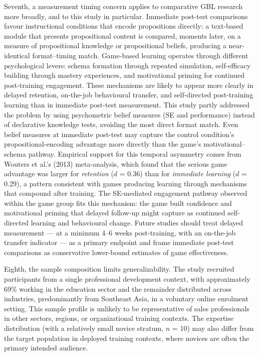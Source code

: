 \documentclass[12pt]{report}
\begin{document}
Seventh, a measurement timing concern applies to comparative GBL research more broadly, and to this study in particular. Immediate post-test comparisons favour instructional conditions that encode propositions directly: a text-based module that presents propositional content is compared, moments later, on a measure of propositional knowledge or propositional beliefs, producing a near-identical format--timing match. Game-based learning operates through different psychological levers: schema formation through repeated simulation, self-efficacy building through mastery experiences, and motivational priming for continued post-training engagement. These mechanisms are likely to appear more clearly in delayed retention, on-the-job behavioural transfer, and self-directed post-training learning than in immediate post-test measurement. This study partly addressed the problem by using psychometric belief measures (SE and performance) instead of declarative knowledge tests, avoiding the most direct format match. Even belief measures at immediate post-test may capture the control condition's propositional-encoding advantage more directly than the game's motivational--schema pathway. Empirical support for this temporal asymmetry comes from Wouters et al.'s (2013) meta-analysis, which found that the serious game advantage was larger for \textit{retention} ($d$ = 0.36) than for \textit{immediate learning} ($d$ = 0.29), a pattern consistent with games producing learning through mechanisms that compound after training. The SE-mediated engagement pathway observed within the game group fits this mechanism: the game built confidence and motivational priming that delayed follow-up might capture as continued self-directed learning and behavioural change. Future studies should treat delayed measurement --- at a minimum 4--6 weeks post-training, with an on-the-job transfer indicator --- as a primary endpoint and frame immediate post-test comparisons as conservative lower-bound estimates of game effectiveness.

Eighth, the sample composition limits generalizability. The study recruited participants from a single professional development context, with approximately 69\% working in the education sector and the remainder distributed across industries, predominantly from Southeast Asia, in a voluntary online enrolment setting. This sample profile is unlikely to be representative of sales professionals in other sectors, regions, or organizational training contexts. The expertise distribution (with a relatively small novice stratum, $n$ = 10) may also differ from the target population in deployed training contexts, where novices are often the primary intended audience.
\end{document}
